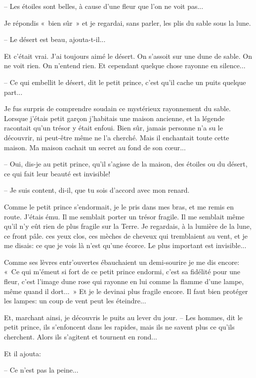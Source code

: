 \documentclass[a4paper]{report}
\begin{document}
-- Les étoiles sont belles, à cause d'une fleur que l'on ne voit pas...

Je répondis «~bien sûr~» et je regardai, sans parler, les plis du sable sous la lune.

-- Le désert est beau, ajouta-t-il...

Et c'était vrai. J'ai toujours aimé le désert. On s'assoit sur une dune de sable. On ne voit rien. On n'entend rien. Et cependant quelque chose rayonne en silence...

-- Ce qui embellit le désert, dit le petit prince, c'est qu'il cache un puits quelque part...

Je fus surpris de comprendre soudain ce mystérieux rayonnement du sable. Lorsque j'étais petit garçon j'habitais une maison ancienne, et la légende racontait qu'un trésor y était enfoui. Bien sûr, jamais personne n'a su le découvrir, ni peut-être même ne l'a cherché. Mais il enchantait toute cette maison. Ma maison cachait un secret au fond de son cœur...

-- Oui, dis-je au petit prince, qu'il s'agisse de la maison, des étoiles ou du désert, ce qui fait leur beauté est invisible!

-- Je suis content, di-il, que tu sois d'accord avec mon renard.

Comme le petit prince s'endormait, je le pris dans mes bras, et me remis en route. J'étais ému. Il me semblait porter un trésor fragile. Il me semblait même qu'il n'y eût rien de plus fragile sur la Terre. Je regardais, à la lumière de la lune, ce front pâle. ces yeux clos, ces mèches de cheveux qui tremblaient au vent, et je me disais: ce que je vois là n'est qu'une écorce. Le plus important est invisible...

Comme ses lèvres entr'ouvertes ébauchaient un demi-sourire je me dis encore: «~Ce qui m'émeut si fort de ce petit prince endormi, c'est sa fidélité pour une fleur, c'est l'image dune rose qui rayonne en lui comme la flamme d'une lampe, même quand il dort...~» Et je le devinai plus fragile encore. Il faut bien protéger les lampes: un coup de vent peut les éteindre...

Et, marchant ainsi, je découvris le puits au lever du jour.
\parachapter{} %
-- Les hommes, dit le petit prince, ils s'enfoncent dans les rapides, mais ils ne savent plus ce qu'ils cherchent. Alors ils s'agitent et tournent en rond...

Et il ajouta:

-- Ce n'est pas la peine...
\end{document}
